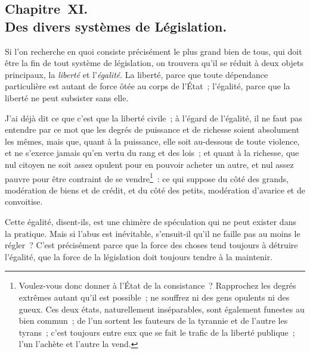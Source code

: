 \documentclass[french,twoside]{book} %
\begin{document}
\subsection[{Chapitre XI. Des divers systèmes de Législation.}]{Chapitre XI. \\
Des divers systèmes de Législation.}
\noindent Si l’on recherche en quoi consiste précisément le plus grand bien de tous, qui doit être la fin de tout système de législation, on trouvera qu’il se réduit à deux objets principaux, la {\itshape liberté} et l’{\itshape égalité}. La liberté, parce que toute dépendance particulière est autant de force ôtée au corps de l’État ; l’égalité, parce que la liberté ne peut subsister sans elle.\par
J’ai déjà dit ce que c’est que la liberté civile ; à l’égard de l’égalité, il ne faut pas entendre par ce mot que les degrés de puissance et de richesse soient absolument les mêmes, mais que, quant à la puissance, elle soit au-dessous de toute violence, et ne s’exerce jamais qu’en vertu du rang et des lois ; et quant à la richesse, que nul citoyen ne soit assez opulent pour en pouvoir acheter un autre, et nul assez pauvre pour être contraint de se vendre\footnote{Voulez-vous donc donner à l’État de la consistance ? Rapprochez les degrés extrêmes autant qu’il est possible ; ne souffrez ni des gens opulents ni des gueux. Ces deux états, naturellement inséparables, sont également funestes au bien commun ; de l’un sortent les fauteurs de la tyrannie et de l’autre les tyrans ; c’est toujours entre eux que se fait le trafic de la liberté publique ; l’un l’achète et l’autre la vend.} : ce qui suppose du côté des grands, modération de biens et de crédit, et du côté des petits, modération d’avarice et de convoitise.\par
Cette égalité, disent-ils, est une chimère de spéculation qui ne peut exister dans la pratique. Mais si l’abus est inévitable, s’ensuit-il qu’il ne faille pas au moins le régler ? C’est précisément parce que la force des choses tend toujours à détruire l’égalité, que la force de la législation doit toujours tendre à la maintenir.\par
\end{document}
